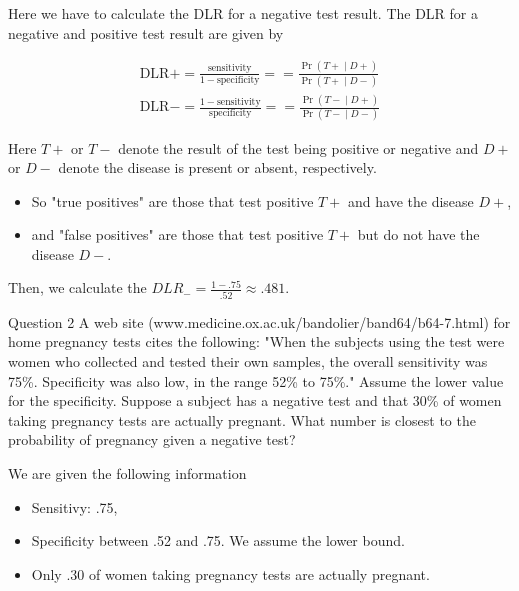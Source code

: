\documentclass{homework}
\begin{document}
Here we have to calculate the DLR for a negative test result. The DLR for a negative and positive test result are given by

\begin{align*}
    {\displaystyle {\text{DLR}}+={\frac {\text{sensitivity}}{1-{\text{specificity}}}}} = {\displaystyle ={\frac {\Pr({T+}\mid D+)}{\Pr({T+}\mid D-)}}} \\ 
    {\displaystyle {\text{DLR}}-={\frac {1-{\text{sensitivity}}}{\text{specificity}}}} = {\displaystyle ={\frac {\Pr({T-}\mid D+)}{\Pr({T-}\mid D-)}}}
\end{align*}

Here $T+$ or $T-$ denote the result of the test being positive or negative and $D+$ or $D-$ denote the disease is present or absent, respectively. 

\begin{itemize}
    \item So "true positives" are those that test positive $T+$ and have the disease $D+$,
    \item and "false positives" are those that test positive $T+$ but do not have the disease $D-$.
\end{itemize}

Then, we calculate the $DLR_- = \frac{1-.75}{.52} \approx .481$.\\

\begin{tcolorbox}[title=Question 2]
Question 2
A web site (www.medicine.ox.ac.uk/bandolier/band64/b64-7.html) for home pregnancy tests cites the following: "When the subjects using the test were women who collected and tested their own samples, the overall sensitivity was 75\%. Specificity was also low, in the range 52\% to 75\%." Assume the lower value for the specificity. Suppose a subject has a negative test and that 30\% of women taking pregnancy tests are actually pregnant. What number is closest to the probability of pregnancy given a negative test?
\end{tcolorbox}

We are given the following information

\begin{itemize}
    \item Sensitivy: .75,
    \item Specificity between .52 and .75. We assume the lower bound.
    \item Only .30 of women taking pregnancy tests are actually pregnant. 
\end{itemize}
\end{document}
